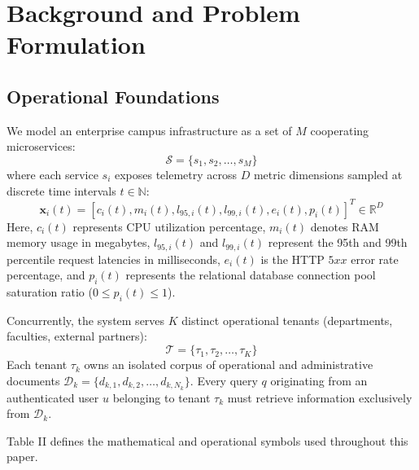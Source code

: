 \documentclass[12pt,onecolumn,draftclsnofoot]{IEEEtran}
\begin{document}
\section{Background and Problem Formulation}

\subsection{Operational Foundations}
We model an enterprise campus infrastructure as a set of $M$ cooperating microservices:
\begin{equation}
\mathcal{S} = \{s_1, s_2, \dots, s_M\}
\end{equation}
where each service $s_i$ exposes telemetry across $D$ metric dimensions sampled at discrete time intervals $t \in \mathbb{N}$:
\begin{equation}
\mathbf{x}_i(t) = \left[ c_i(t), m_i(t), l_{95,i}(t), l_{99,i}(t), e_i(t), p_i(t) \right]^T \in \mathbb{R}^D
\end{equation}
Here, $c_i(t)$ represents CPU utilization percentage, $m_i(t)$ denotes RAM memory usage in megabytes, $l_{95,i}(t)$ and $l_{99,i}(t)$ represent the 95th and 99th percentile request latencies in milliseconds, $e_i(t)$ is the HTTP $5xx$ error rate percentage, and $p_i(t)$ represents the relational database connection pool saturation ratio ($0 \le p_i(t) \le 1$).

Concurrently, the system serves $K$ distinct operational tenants (departments, faculties, external partners):
\begin{equation}
\mathcal{T} = \{\tau_1, \tau_2, \dots, \tau_K\}
\end{equation}
Each tenant $\tau_k$ owns an isolated corpus of operational and administrative documents $\mathcal{D}_k = \{d_{k,1}, d_{k,2}, \dots, d_{k,N_k}\}$. Every query $q$ originating from an authenticated user $u$ belonging to tenant $\tau_k$ must retrieve information exclusively from $\mathcal{D}_k$.

Table II defines the mathematical and operational symbols used throughout this paper.
\end{document}
